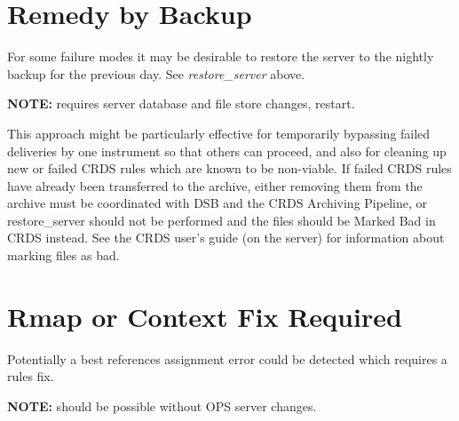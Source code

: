 \documentclass[letterpaper,10pt,english]{sphinxmanual}
\begin{document}
\section{Remedy by Backup}
\label{server_guide:remedy-by-backup}
For some failure modes it may be desirable to restore the server to the nightly backup for the previous day.  See
\emph{restore\_server} above.

\textbf{NOTE:}  requires server database and file store changes,  restart.

This approach might be particularly effective for temporarily bypassing failed deliveries
by one instrument so that others can proceed,  and also for cleaning up new or failed CRDS rules which are known to
be non-viable.   If failed CRDS rules have already been transferred to the archive,  either removing them from the
archive must be coordinated with DSB and the CRDS Archiving Pipeline,  or restore\_server should not be performed and
the files should be Marked Bad in CRDS instead.   See the CRDS user's guide (on the server) for information about
marking files as bad.


\section{Rmap or Context Fix Required}
\label{server_guide:rmap-or-context-fix-required}
Potentially a best references assignment error could be detected which requires a rules fix.

\textbf{NOTE:} should be possible without OPS server changes.
\end{document}
